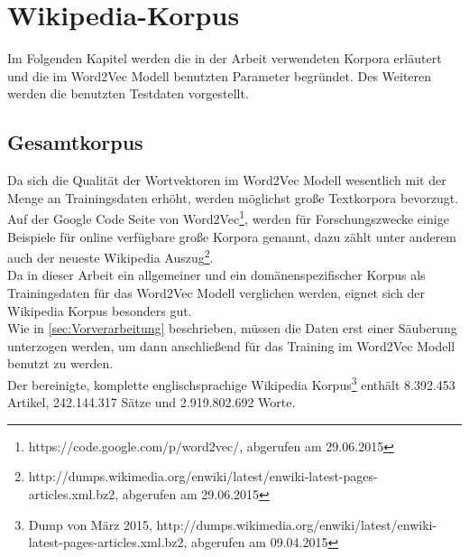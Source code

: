 \documentclass[12pt,a4paper]{report}
\begin{document}
	

	
	
\newpage
\chapter{Wikipedia-Korpus}
Im Folgenden Kapitel werden die in der Arbeit verwendeten Korpora erläutert und die im Word2Vec Modell benutzten Parameter begründet. Des Weiteren werden die benutzten Testdaten vorgestellt.

	\section{Gesamtkorpus}
	\label{sec:Gesamtkorpus}
	Da sich die Qualität  der Wortvektoren im Word2Vec Modell wesentlich mit der Menge an Trainingsdaten erhöht\citep{DBLP:journals/corr/abs-1301-3781}, werden möglichst große Textkorpora bevorzugt. Auf der Google Code Seite von Word2Vec\footnote{https://code.google.com/p/word2vec/, abgerufen am 29.06.2015}, werden für Forschungszwecke einige Beispiele für online verfügbare große Korpora genannt, dazu zählt unter anderem auch der neueste Wikipedia Auszug\footnote{http://dumps.wikimedia.org/enwiki/latest/enwiki-latest-pages-articles.xml.bz2, abgerufen am 29.06.2015}.\\
	Da in dieser Arbeit ein allgemeiner und ein domänenspezifischer Korpus als Trainingsdaten für das Word2Vec Modell verglichen werden, eignet sich der Wikipedia Korpus besonders gut. \\
	Wie in \ref{sec:Vorverarbeitung} beschrieben, müssen die Daten erst einer Säuberung unterzogen werden, um dann anschließend für das Training im Word2Vec Modell benutzt zu werden.\\
	 Der bereinigte, komplette englischsprachige Wikipedia Korpus\footnote{Dump von März 2015, http://dumps.wikimedia.org/enwiki/latest/enwiki-latest-pages-articles.xml.bz2, abgerufen am 09.04.2015} enthält 8.392.453 Artikel, 242.144.317 Sätze und 2.919.802.692 Worte.\\
\end{document}
